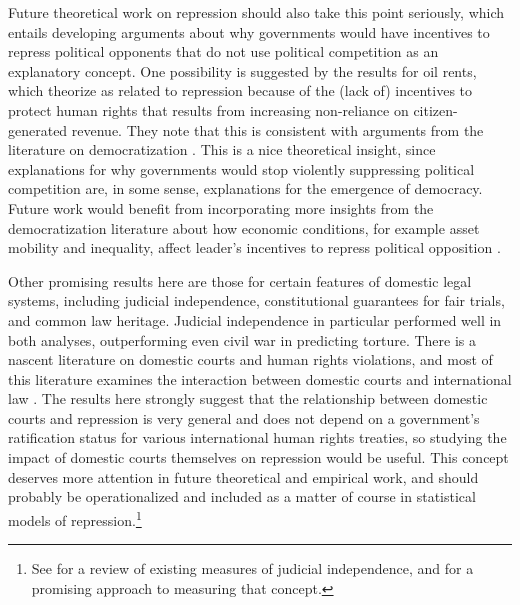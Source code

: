 \documentclass[12pt]{article}
\begin{document}
Future theoretical work on repression should also take this point seriously, which entails developing arguments about why governments would have incentives to repress political opponents that do not use political competition as an explanatory concept. One possibility is suggested by the results for oil rents, which \citet{DemerittYoung2013} theorize as related to repression because of the (lack of) incentives to protect human rights that results from increasing non-reliance on citizen-generated revenue. They note that this is consistent with arguments from the literature on democratization \citep[E.g.][]{Huntington1991,BDMSmith2009}. This is a nice theoretical insight, since explanations for why governments would stop violently suppressing political competition are, in some sense, explanations for the emergence of democracy. Future work would benefit from incorporating more insights from the democratization literature about how economic conditions, for example asset mobility and inequality, affect leader's incentives to repress political opposition \citep[See, e.g.][]{Boix2003,AcemogluRobinson2005,ClarkGolderGolder2013}. 

Other promising results here are those for certain features of domestic legal systems, including judicial independence, constitutional guarantees for fair trials, and common law heritage. Judicial independence in particular performed well in both analyses, outperforming even civil war in predicting torture. There is a nascent literature on domestic courts and human rights violations, and most of this literature examines the interaction between domestic courts and international law \citep{Hathaway2007,PowellStaton2009,Simmons2009,Conrad2012,ConradRitter2013,Lupu2013}. The results here strongly suggest that the relationship between domestic courts and repression is very general and does not depend on a government's ratification status for various international human rights treaties, so studying the impact of domestic courts themselves on repression would be useful. This concept deserves more attention in future theoretical and empirical work, and should probably be operationalized and included as a matter of course in statistical models of repression.\footnote{See \citet{RiosStaton2012} for a review of existing measures of judicial independence, and \citet{LinzerStaton2011} for a promising approach to measuring that concept.} 
\end{document}
